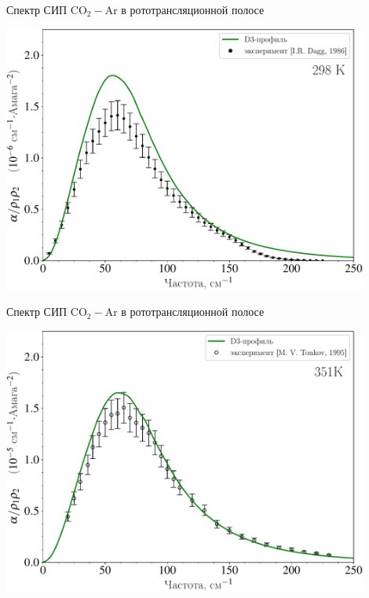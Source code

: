 \documentclass[10pt,usenames,pdf,hyperref={unicode},dvipsnames]{beamer}
\begin{document}
\begin{frame}{Спектр СИП CO$_2-$Ar в рототрансляционной полосе}
	\begin{center}
		\includegraphics[width=0.9\textwidth]{./pictures/co2ar_298K-crop.pdf}
	\end{center}
\end{frame}

\begin{frame}{Спектр СИП CO$_2-$Ar в рототрансляционной полосе}
	\begin{center}
		\includegraphics[width=0.9\textwidth]{./pictures/351K_russian_legend-crop.pdf}
	\end{center}
\end{frame}
\end{document}
